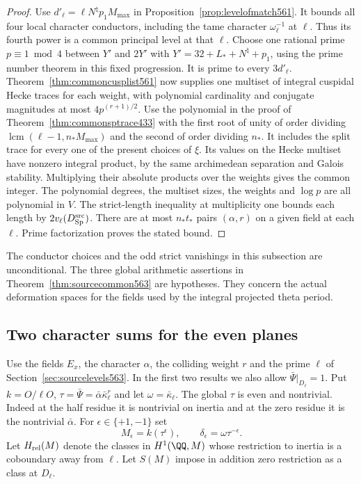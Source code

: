 \documentclass[a4paper,11pt]{article}
\theoremstyle{definition}
\theoremstyle{remark}
\numberwithin{equation}{section}
\begin{document}
\begin{proof}
Use \(d'_\ell=\ell N^\natural p_1M_{\max}\) in
Proposition~\ref{prop:levelofmatch561}. It bounds all four
local character conductors, including the tame character
\(\omega_\ell^{-1}\) at \(\ell\). Thus its fourth power is a
common principal level at that \(\ell\). Choose one rational
prime \(p\equiv1\bmod4\) between \(Y'\) and \(2Y'\) with
\(Y'=32+L_*+N^\natural+p_1\), using the prime number theorem
in this fixed progression. It is prime to every \(3d'_\ell\).
Theorem~\ref{thm:commoncusplist561} now supplies one multiset
of integral cuspidal Hecke traces for each weight, with
polynomial cardinality and conjugate magnitudes at most
\(4p^{(r+1)/2}\). Use the polynomial in the proof of
Theorem~\ref{thm:commonsptrace433} with the first root of
unity of order dividing
\(\operatorname{lcm}(\ell-1,n_*M_{\max})\) and the second
of order dividing \(n_*\). It includes the split trace for
every one of the present choices of \(\xi\). Its values on
the Hecke multiset have nonzero integral product, by the
same archimedean separation and Galois stability. Multiplying
their absolute products over the weights gives the common
integer. The polynomial degrees, the multiset sizes, the
weights and \(\log p\) are all polynomial in \(V\).
The strict-length inequality at multiplicity one bounds
each length by \(2v_\ell(D_{\rm Sp}^{\rm src})\). There are
at most \(n_*t_*\) pairs \((\alpha,r)\) on a given field at
each \(\ell\). Prime factorization proves the stated bound.
\end{proof}

The conductor choices and the odd strict vanishings in this
subsection are unconditional. The three global arithmetic
assertions in Theorem~\ref{thm:sourcecommon563} are hypotheses.
They concern the actual deformation spaces for the fields
used by the integral projected theta period.


\subsection{Two character sums for the even planes}
\label{sec:mirrors565}

Use the fields \(E_x\), the character \(\alpha\), the colliding
weight \(r\) and the prime \(\ell\) of Section~\ref{sec:sourcelevels563}.
In the first two results we also allow \(\bar\Psi|_{D_\ell}=1\).
Put \(k=O/\ell O\), \(\tau=\bar\Psi=\bar\alpha\bar\kappa_\ell^r\)
and let \(\omega=\bar\kappa_\ell\). The global \(\tau\) is even
and nontrivial. Indeed at the half residue it is nontrivial on
inertia and at the zero residue it is the nontrivial \(\bar\alpha\).
For \(\epsilon\in\{+1,-1\}\) set
\[
          M_\epsilon=k(\tau^\epsilon),\qquad
          \delta_\epsilon=\omega\tau^{-\epsilon}.
\]
Let \(H_{\rm rel}(M)\) denote the classes in \(H^1(\QQ,M)\)
whose restriction to inertia is a coboundary away from \(\ell\).
Let \(S(M)\) impose in addition zero restriction as a class at
\(D_\ell\).
\end{document}
